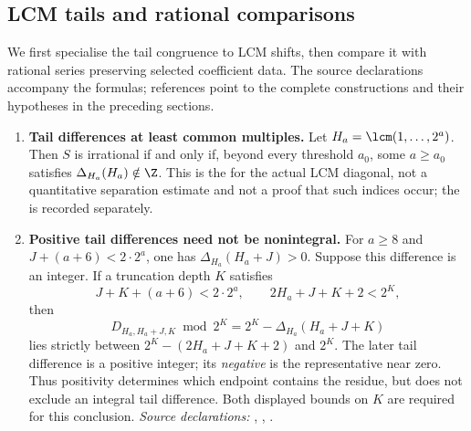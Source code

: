 \subsection{LCM tails and rational comparisons}\label{long249:r3-comparisons}
We first specialise the tail congruence to LCM shifts, then compare
it with rational series preserving selected coefficient data. The
source declarations accompany the formulas; references point to the
complete constructions and their hypotheses in the preceding sections.

\begin{enumerate}
\item\label{res:actualorbit}
\textbf{Tail differences at least common multiples.}  Let
$H_a=\lcm(1,\ldots,2^a)$. Then $S$ is irrational if and only if,
beyond every threshold $a_0$, some $a\ge a_0$ satisfies
$\Delta_{H_a}(H_a)\notin\Z$.  This is the
for the actual LCM diagonal, not a quantitative
separation estimate and not a proof that such indices occur; the
is recorded separately.

\item\label{res:actualsign}
\textbf{Positive tail differences need not be nonintegral.} For $a\ge8$ and
$J+(a+6)<2\cdot2^a$, one has $\Delta_{H_a}(H_a+J)>0$.
Suppose this difference is an integer. If a truncation depth $K$ satisfies
\[
 J+K+(a+6)<2\cdot2^a,
 \qquad 2H_a+J+K+2<2^K,
\]
then
\[
 D_{H_a,H_a+J,K}\bmod2^K
   =2^K-\Delta_{H_a}(H_a+J+K)
\]
lies strictly between $2^K-(2H_a+J+K+2)$ and $2^K$.
The later tail difference is a positive integer; its \emph{negative} is
the representative near zero. Thus positivity determines which endpoint
contains the residue, but does not exclude an integral tail difference.
Both displayed bounds on $K$ are required for this conclusion.
{\footnotesize\emph{Source declarations:}
,
,
.}


\end{enumerate}
